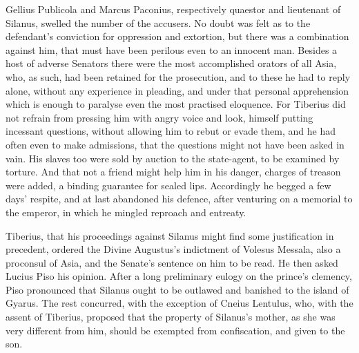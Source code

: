 Gellius Publicola and Marcus Paconius, respectively quaestor and lieutenant of Silanus, swelled the number of the accusers. No doubt was felt as to the defendant's conviction for oppression and extortion, but there was a combination against him, that must have been perilous even to an innocent man. Besides a host of adverse Senators there were the most accomplished orators of all Asia, who, as such, had been retained for the prosecution, and to these he had to reply alone, without any experience in pleading, and under that personal apprehension which is enough to paralyse even the most practised eloquence. For Tiberius did not refrain from pressing him with angry voice and look, himself putting incessant questions, without allowing him to rebut or evade them, and he had often even to make admissions, that the questions might not have been asked in vain. His slaves too were sold by auction to the state-agent, to be examined by torture. And that not a friend might help him in his danger, charges of treason were added, a binding guarantee for sealed lips. Accordingly he begged a few days' respite, and at last abandoned his defence, after venturing on a memorial to the emperor, in which he mingled reproach and entreaty.


Tiberius, that his proceedings against Silanus might find some justification in precedent, ordered the Divine Augustus's indictment of Volesus Messala, also a proconsul of Asia, and the Senate's sentence on him to be read. He then asked Lucius Piso his opinion. After a long preliminary eulogy on the prince's clemency, Piso pronounced that Silanus ought to be outlawed and banished to the island of Gyarus. The rest concurred, with the exception of Cneius Lentulus, who, with the assent of Tiberius, proposed that the property of Silanus's mother, as she was very different from him, should be exempted from confiscation, and given to the son.


